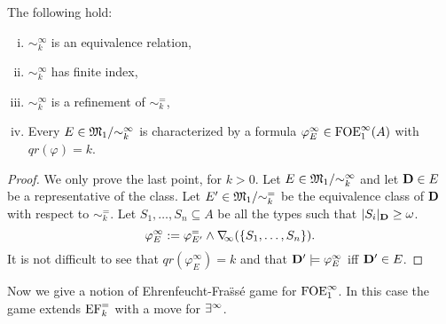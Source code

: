 \begin{proposition}\label{props:eqrelolque} The following hold:
	\begin{enumerate}[(i)]
		 pt
		\item $\sim^\infty_k$ is an equivalence relation,
		\item $\sim^\infty_k$ has finite index,
		\item $\sim^\infty_k$ is a refinement of $\sim^=_k$,
		\item Every $E \in \mathfrak{M}_1/{\sim^\infty_k}$ is characterized by a formula $\varphi^\infty_E \in \mathrm{FOE}^{\infty}_1(A)$ with $qr(\varphi) = k$.
	\end{enumerate}
\end{proposition}
\begin{proof}
	We only prove the last point, for $k>0$. Let $E \in \mathfrak{M}_1/{\sim^\infty_k}$ and let $\mathbf{D} \in E$ be a representative of the class. Let $E' \in \mathfrak{M}_1/{\sim^=_k}$ be the equivalence class of $\mathbf{D}$ with respect to $\sim^=_k$.
	Let $S_1,\dots,S_n \subseteq A$ be all the types such that $|S_i|_{\mathbf{D}} \geq \omega$. %
	\[
	\varphi^\infty_E := \varphi^=_{E'} \land
		\nabla_{\!\!\infty}(\{S_1,\dots,S_n\}) .
	\]
	It is not difficult to see that $qr(\varphi^\infty_E) = k$ and that $\mathbf{D}' \models \varphi^\infty_E$ iff $\mathbf{D}' \in E$. %
\end{proof}

Now we give a notion of Ehrenfeucht-Fra\"ss\'e game for $\mathrm{FOE}^{\infty}_1$. In this case the game extends $\mathrm{EF}^=_k$ with a move for $\exists^\infty$.

